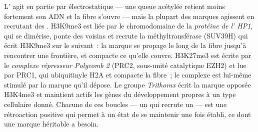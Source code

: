 \begin{proposition}\label{prop:b3:chromatin-epigenetics:readers}
L' agit en partie par électrostatique --- une queue acétylée
retient moins fortement son ADN et la fibre s'ouvre --- mais la plupart
des marques agissent en recrutant des . H3K9me3 est liée par le
chromodomaine de la \emph{protéine de l' HP1}, qui se
dimérise, ponte des  voisins et recrute la
méthyltransférase (SUV39H) qui écrit H3K9me3 sur le 
suivant~: la marque se propage le long de la fibre jusqu'à rencontrer
une frontière, et compacte ce qu'elle couvre. H3K27me3 est écrite par
le \emph{complexe répresseur Polycomb 2} (PRC2, sous-unité catalytique
EZH2) et lue par PRC1, qui ubiquitinyle H2A et compacte la fibre~; le
complexe est lui-même stimulé par la marque qu'il dépose. Le groupe
\emph{Trithorax} écrit la marque opposée H3K4me3 et maintient actifs
les gènes du développement propres à un type cellulaire donné. Chacune
de ces boucles --- un  qui recrute un  --- est une
rétroaction positive qui permet à un état de se maintenir une fois
établi, ce dont une marque héritable a besoin.
\end{proposition}

